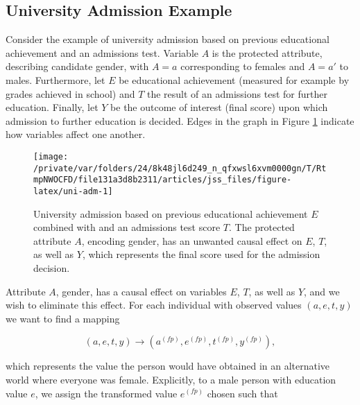 \documentclass[
  nojss]{jss}
\begin{document}
\hypertarget{university-admission-example}{%
\subsection{University Admission
Example}\label{university-admission-example}}

Consider the example of university admission based on previous
educational achievement and an admissions test. Variable \(A\) is the
protected attribute, describing candidate gender, with \(A = a\)
corresponding to females and \(A = a'\) to males. Furthermore, let \(E\)
be educational achievement (measured for example by grades achieved in
school) and \(T\) the result of an admissions test for further
education. Finally, let \(Y\) be the outcome of interest (final score)
upon which admission to further education is decided. Edges in the graph
in Figure \ref{fig:uni-adm} indicate how variables affect one another.

\begin{CodeChunk}
\begin{figure}

{\centering \texttt{[image: /private/var/folders/24/8k48jl6d249\_n\_qfxwsl6xvm0000gn/T/RtmpNWOCFD/file131a3d8b2311/articles/jss\_files/figure-latex/uni-adm-1]} 

}

\caption[University admission based on previous educational achievement $E$ combined with and an admissions test score $T$]{University admission based on previous educational achievement $E$ combined with and an admissions test score $T$. The protected attribute $A$, encoding gender, has an unwanted causal effect on  $E$, $T$, as well as $Y$, which represents the final score used for the admission decision.}\label{fig:uni-adm}
\end{figure}
\end{CodeChunk}

Attribute \(A\), gender, has a causal effect on variables \(E\), \(T\),
as well as \(Y\), and we wish to eliminate this effect. For each
individual with observed values \((a, e, t, y)\) we want to find a
mapping

\[(a, e, t, y) \longrightarrow  ( {a}^{(fp)},  {e}^{(fp)},  {t}^{(fp)},  {y}^{(fp)}),\]

which represents the value the person would have obtained in an
alternative world where everyone was female. Explicitly, to a male
person with education value \(e\), we assign the transformed value
\( {e}^{(fp)}\) chosen such that
\end{document}
